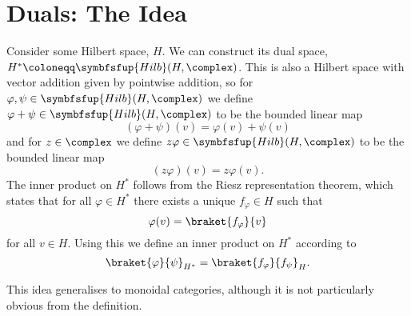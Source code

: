 \documentclass[fleqn]{NotesClass}
\makeatletter
\newcommand{\c@egory}[1]{\symbfsfup{#1}}
\newcommand{\Hilb}{\c@egory{Hilb}}
\makeatother
\begin{document}
    \section{Duals: The Idea}
    Consider some Hilbert space, \(H\).
    We can construct its dual space, \(H^* \coloneqq \Hilb(H, \complex)\).
    This is also a Hilbert space with vector addition given by pointwise addition, so for \(\varphi, \psi \in \Hilb(H, \complex)\) we define \(\varphi + \psi \in \Hilb(H, \complex)\) to be the bounded linear map
    \begin{equation}
        (\varphi + \psi)(v) = \varphi(v) + \psi(v)
    \end{equation}
    and for \(z \in \complex\) we define \(z\varphi \in \Hilb(H, \complex)\) to be the bounded linear map
    \begin{equation}
        (z\varphi)(v) = z\varphi(v).
    \end{equation}
    The inner product on \(H^*\) follows from the Riesz representation theorem, which states that for all \(\varphi \in H^*\) there exists a unique \(f_\varphi \in H\) such that
    \begin{equation}
        \varphi(v) = \braket{f_\varphi}{v}
    \end{equation}
    for all \(v \in H\).
    Using this we define an inner product on \(H^*\) according to
    \begin{equation}
        \braket{\varphi}{\psi}_{H^*} = \braket{f_{\varphi}}{f_{\psi}}_{H}.
    \end{equation}
    
    This idea generalises to monoidal categories, although it is not particularly obvious from the definition.
    
\end{document}
